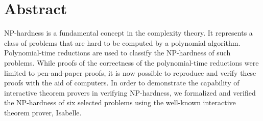 \newcommand{\abstractname}{Abstract}


\chapter{\abstractname}
NP-hardness is a fundamental concept in the complexity theory. It represents a class of problems that 
are hard to be computed by a polynomial algorithm. Polynomial-time reductions are used 
to classify the NP-hardness of such problems. While proofs of the correctness of the polynomial-time reductions 
were limited to pen-and-paper proofs, 
it is now possible to reproduce and verify these proofs with the aid of computers. 
In order to demonstrate the capability of interactive theorem provers in verifying NP-hardness, 
we formalized and verified the NP-hardness of six selected problems using 
the well-known interactive theorem prover, Isabelle.